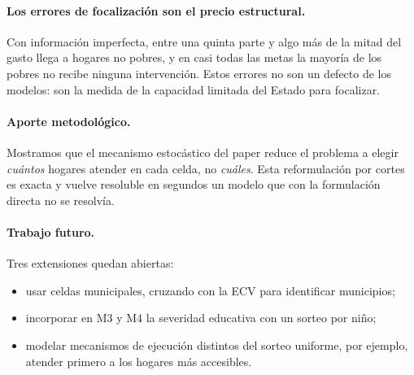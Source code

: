 \paragraph{Los errores de focalización son el precio estructural.} Con
información imperfecta, entre una quinta parte y algo más de la mitad del gasto
llega a hogares no pobres, y en casi todas las metas la mayoría de los pobres no
recibe ninguna intervención. Estos errores no son un defecto de los modelos: son la
medida de la capacidad limitada del Estado para focalizar.

\paragraph{Aporte metodológico.} Mostramos que el mecanismo estocástico del paper
reduce el problema a elegir \emph{cuántos} hogares atender en cada celda, no
\emph{cuáles}. Esta reformulación por cortes es exacta y vuelve resoluble en
segundos un modelo que con la formulación directa no se resolvía.

\paragraph{Trabajo futuro.} Tres extensiones quedan abiertas:
\begin{itemize}
\item usar celdas municipales, cruzando con la ECV para identificar municipios;
\item incorporar en M3 y M4 la severidad educativa con un sorteo por niño;
\item modelar mecanismos de ejecución distintos del sorteo uniforme, por ejemplo,
  atender primero a los hogares más accesibles.
\end{itemize}
